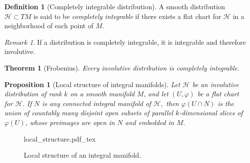 \documentclass [xcolor=svgnames, t] {beamer}
\newcommand{\incfig}[2][1]{%
    \def\svgwidth{#1\columnwidth}
    {#2.pdf_tex}
}
\theoremstyle{definition}
\newtheorem{df}{Definition}
\theoremstyle{plain}
\newtheorem{prop}{Proposition}
\newtheorem{thm}{Theorem}
\theoremstyle{remark}
\newtheorem{rem}{Remark}
\begin{document}
\begin{frame}[fragile]
	\begin{df}[Completely integrable distribution]
	A smooth distribution $ \mathcal{H}\subset TM $  is said to be \textit{completely integrable} if there exists a flat chart for $ \mathcal{H} $ in a neighborhood of each point of $ M. $ 
\end{df}
\begin{rem}
	If a distribution is completely integrable, it is integrable and therefore involutive.
\end{rem}
\begin{thm}[Frobenius]
	Every involutive distribution is completely integrable.	
\end{thm}
\end{frame}
\begin{frame}[fragile]
\begin{prop}[Local structure of integral manifolds]\label{prop:local_structure}
	Let $ \mathcal{H} $ be an involutive distribution of rank $ k $ on a smooth manifold $ M $, and let $ (U,\varphi) $ be a flat chart for $ \mathcal{H} $. If $ N $ is any connected integral manifold of $ \mathcal{H}, $ then $ \varphi(U\cap N) $ is the union of countably many disjoint open subsets of parallel $ k $-dimensional slices of $ \varphi(U) $, whose preimages are open in $ N $ and embedded in $ M $.
\end{prop}
\begin{figure}
    \centering
    \incfig[0.8]{local_structure}
    \caption{Local structure of an integral manifold.}
    \label{fig:local_structure}
\end{figure}
\end{frame}
\end{document}
